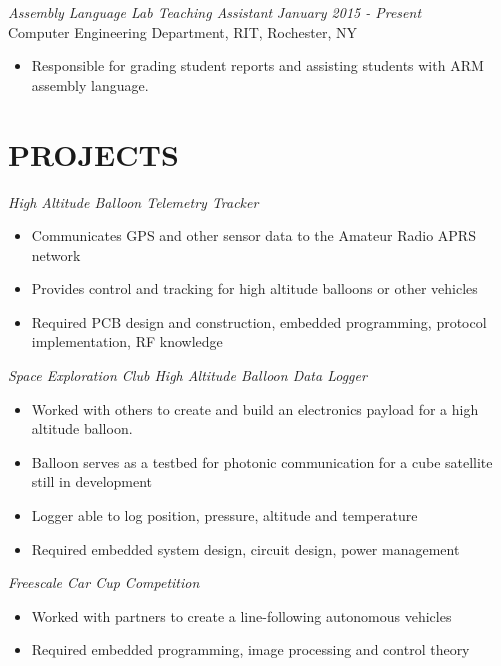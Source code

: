 \documentclass[line,margin]{res}
\begin{document}
\begin{resume}

	\vspace{-5pt}
		{\sl Assembly Language Lab Teaching Assistant } \hfill {\sl January 2015 - Present} \\
		Computer Engineering Department, RIT, Rochester, NY
		\begin{itemize}  \itemsep -2pt %
			\item Responsible for grading student reports and assisting students with ARM assembly language. 
		\end{itemize} 
\section{PROJECTS}
	{\sl High Altitude Balloon Telemetry Tracker }
		\begin{itemize} \itemsep -2pt
			\item Communicates GPS and other sensor data to the Amateur Radio APRS network
			\item Provides control and tracking for high altitude balloons or other vehicles
			\item Required PCB design and construction, embedded programming, protocol implementation, RF knowledge
		\end{itemize}

	\vspace{-10pt}
	{\sl Space Exploration Club High Altitude Balloon Data Logger}
		\begin{itemize} \itemsep -2pt
			\item Worked with others to create and build an electronics payload for a high altitude balloon.
			\item Balloon serves as a testbed for photonic communication for a cube satellite still in development 
			\item Logger able to log position, pressure, altitude and temperature 
			\item Required embedded system design, circuit design, power management
		\end{itemize}
	\vspace{-10pt}
	{\sl Freescale Car Cup Competition}
		\begin{itemize} \itemsep -2pt
			\item Worked with partners to create a line-following autonomous vehicles
			\item Required embedded programming, image processing and control theory
		\end{itemize}


\end{resume}
\end{document}
